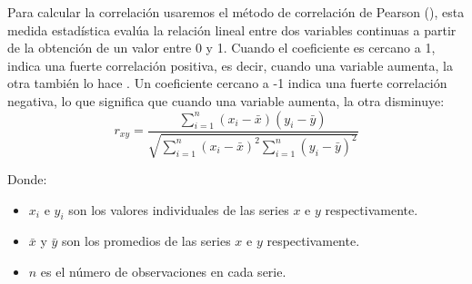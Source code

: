 
Para calcular la correlación usaremos el método de correlación de Pearson (\cite{Davies_2023}), esta medida estadística evalúa la relación lineal entre dos variables continuas a partir de la obtención de un valor entre 0 y 1. Cuando el coeficiente es cercano a 1, indica una fuerte correlación positiva, es decir, cuando una variable aumenta, la otra también lo hace . Un coeficiente cercano a -1 indica una fuerte correlación negativa, lo que significa que cuando una variable aumenta, la otra disminuye:
$$ r_{xy} = \frac{\sum_{i=1}^{n} (x_i - \bar{x})(y_i - \bar{y})}{\sqrt{\sum_{i=1}^{n} (x_i - \bar{x})^2 \sum_{i=1}^{n} (y_i - \bar{y})^2}} $$

Donde:

\begin{itemize}
    \item $x_i$ e $y_i$ son los valores individuales de las series $x$ e $y$ respectivamente.
    \item $\bar{x}$ y $\bar{y}$ son los promedios de las series $x$ e $y$ respectivamente.
    \item $n$ es el número de observaciones en cada serie.
\end{itemize}

